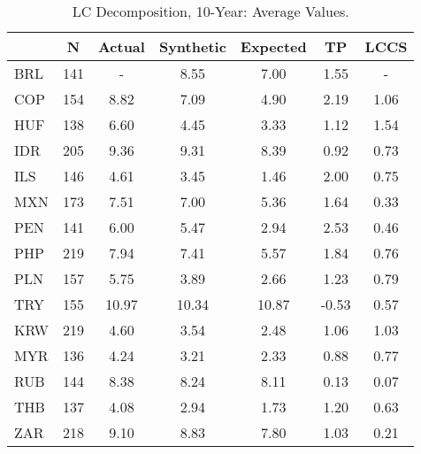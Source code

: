 \begin{tiny}\begin{table}\centering\begin{tabular}{l|cccccc}\toprule & N & Actual & Synthetic & Expected & TP & LCCS \\\midrule BRL & 141 & - & 8.55 & 7.00 & 1.55 & - \\COP & 154 & 8.82 & 7.09 & 4.90 & 2.19 & 1.06 \\HUF & 138 & 6.60 & 4.45 & 3.33 & 1.12 & 1.54 \\IDR & 205 & 9.36 & 9.31 & 8.39 & 0.92 & 0.73 \\ILS & 146 & 4.61 & 3.45 & 1.46 & 2.00 & 0.75 \\MXN & 173 & 7.51 & 7.00 & 5.36 & 1.64 & 0.33 \\PEN & 141 & 6.00 & 5.47 & 2.94 & 2.53 & 0.46 \\PHP & 219 & 7.94 & 7.41 & 5.57 & 1.84 & 0.76 \\PLN & 157 & 5.75 & 3.89 & 2.66 & 1.23 & 0.79 \\TRY & 155 & 10.97 & 10.34 & 10.87 & -0.53 & 0.57 \\KRW & 219 & 4.60 & 3.54 & 2.48 & 1.06 & 1.03 \\MYR & 136 & 4.24 & 3.21 & 2.33 & 0.88 & 0.77 \\RUB & 144 & 8.38 & 8.24 & 8.11 & 0.13 & 0.07 \\THB & 137 & 4.08 & 2.94 & 1.73 & 1.20 & 0.63 \\ZAR & 218 & 9.10 & 8.83 & 7.80 & 1.03 & 0.21 \\\bottomrule\end{tabular}\caption{LC Decomposition, 10-Year: Average Values.}\label{table:Decomp10yr}\end{table}\end{tiny}